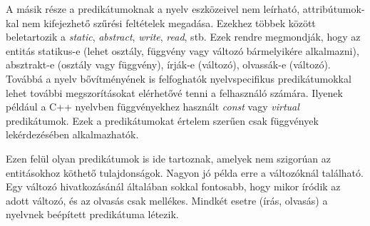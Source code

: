 \documentclass[a4paper,12pt]{report}
\begin{document}
\par A másik része a predikátumoknak a nyelv eszközeivel nem leírható, attribútumok-kal nem kifejezhető szűrési feltételek megadása. Ezekhez többek között beletartozik a \textit{static}, \textit{abstract}, \textit{write}, \textit{read}, stb. Ezek rendre megmondják, hogy az entitás statikus-e (lehet osztály, függvény vagy változó bármelyikére alkalmazni), absztrakt-e (osztály vagy függvény), írják-e (változó), olvassák-e (változó). Továbbá a nyelv bővítményének is felfoghatók nyelvspecifikus predikátumokkal lehet további megszorításokat elérhetővé tenni a felhasználó számára. Ilyenek például a C++ nyelvben függvényekhez használt \textit{const} vagy \textit{virtual} predikátumok. Ezek a predikátumokat értelem szerűen csak függvények lekérdezésében alkalmazhatók.
\par Ezen felül olyan predikátumok is ide tartoznak, amelyek nem szigorúan az entitásokhoz köthető tulajdonságok. Nagyon jó példa erre a változóknál található. Egy változó hivatkozásánál általában sokkal fontosabb, hogy mikor íródik az adott változó, és az olvasás csak mellékes. Mindkét esetre (írás, olvasás) a nyelvnek beépített predikátuma létezik.
\end{document}
